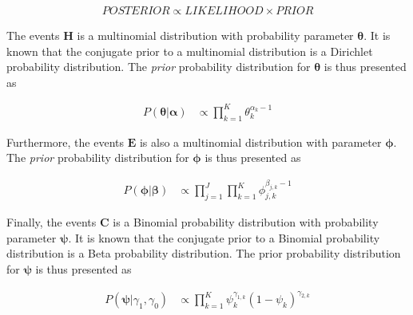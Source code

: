 \begin{equation}
      \label{eq:bhh:optimisation_step:map:bayesian_analysis_lamens}
      \begin{split}
            POSTERIOR \propto LIKELIHOOD \times PRIOR
      \end{split}
\end{equation}

The events $\boldsymbol{H}$ is a multinomial distribution with probability parameter $\boldsymbol{\theta}$. It is known that the conjugate prior to a multinomial distribution is a Dirichlet probability distribution. The \textit{prior} probability distribution for $\boldsymbol{\theta}$ is thus presented as

\begin{equation}
      \label{eq:bhh:optimisation_step:map:map_theta_prior}
      \begin{split}
            P(\boldsymbol{\theta} | \boldsymbol{\alpha})
            &\propto \prod_{k=1}^{K} \theta_{k}^{\alpha_{k} -1}
      \end{split}
\end{equation}

Furthermore, the events $\boldsymbol{E}$ is also a multinomial distribution with parameter $\boldsymbol{\phi}$. The \textit{prior} probability distribution for $\boldsymbol{\phi}$ is thus presented as

\begin{equation}
      \label{eq:bhh:optimisation_step:map:map_phi_prior}
      \begin{split}
            P(\boldsymbol{\phi} \vert \boldsymbol{\beta})
            &\propto \prod_{j=1}^{J}  \prod_{k=1}^{K} \phi_{j,k}^{\beta_{j,k} -1}
      \end{split}
\end{equation}

Finally, the events $\boldsymbol{C}$ is a Binomial probability distribution with probability parameter $\boldsymbol{\psi}$. It is known that the conjugate prior to a Binomial probability distribution is a Beta probability distribution. The prior probability distribution for $\boldsymbol{\psi}$ is thus presented as

\begin{equation}
      \label{eq:bhh:optimisation_step:map:map_psi_prior}
      \begin{split}
            P(\boldsymbol{\psi} | \gamma_{1}, \gamma_{0})
            &\propto \prod_{k=1}^{K} \psi_{k}^{\gamma_{1,k}} (1- \psi_{k})^{\gamma_{2,k}}
      \end{split}
\end{equation}

